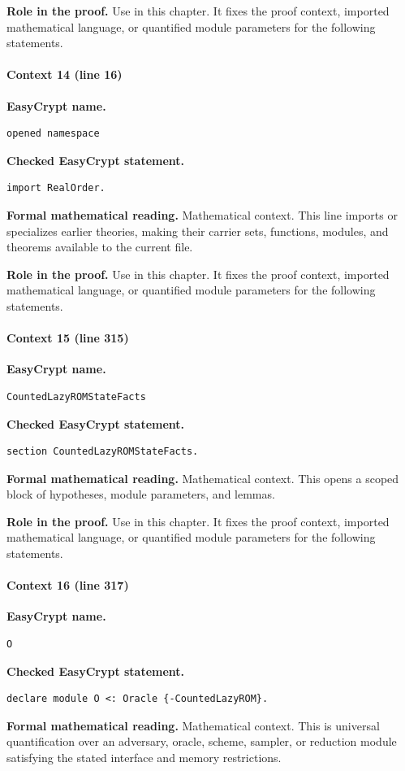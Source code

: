 \noindent\textbf{Role in the proof.}
Use in this chapter. It fixes the proof context, imported mathematical language, or quantified module parameters for the following statements.

\paragraph{Context 14 (line 16)}
\noindent\textbf{EasyCrypt name.}
\begin{lstlisting}[language=EasyCrypt,basicstyle=\ttfamily\scriptsize]
opened namespace
\end{lstlisting}
\noindent\textbf{Checked EasyCrypt statement.}
\begin{lstlisting}[language=EasyCrypt,basicstyle=\ttfamily\scriptsize]
import RealOrder.
\end{lstlisting}
\noindent\textbf{Formal mathematical reading.}
Mathematical context. This line imports or specializes earlier theories, making their carrier sets, functions, modules, and theorems available to the current file.

\noindent\textbf{Role in the proof.}
Use in this chapter. It fixes the proof context, imported mathematical language, or quantified module parameters for the following statements.

\paragraph{Context 15 (line 315)}
\noindent\textbf{EasyCrypt name.}
\begin{lstlisting}[language=EasyCrypt,basicstyle=\ttfamily\scriptsize]
CountedLazyROMStateFacts
\end{lstlisting}
\noindent\textbf{Checked EasyCrypt statement.}
\begin{lstlisting}[language=EasyCrypt,basicstyle=\ttfamily\scriptsize]
section CountedLazyROMStateFacts.
\end{lstlisting}
\noindent\textbf{Formal mathematical reading.}
Mathematical context. This opens a scoped block of hypotheses, module parameters, and lemmas.

\noindent\textbf{Role in the proof.}
Use in this chapter. It fixes the proof context, imported mathematical language, or quantified module parameters for the following statements.

\paragraph{Context 16 (line 317)}
\noindent\textbf{EasyCrypt name.}
\begin{lstlisting}[language=EasyCrypt,basicstyle=\ttfamily\scriptsize]
O
\end{lstlisting}
\noindent\textbf{Checked EasyCrypt statement.}
\begin{lstlisting}[language=EasyCrypt,basicstyle=\ttfamily\scriptsize]
declare module O <: Oracle {-CountedLazyROM}.
\end{lstlisting}
\noindent\textbf{Formal mathematical reading.}
Mathematical context. This is universal quantification over an adversary, oracle, scheme, sampler, or reduction module satisfying the stated interface and memory restrictions.

